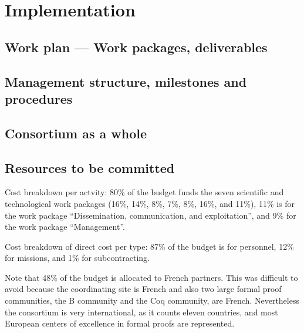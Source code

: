 \chapter{Implementation}\label{chap:implementation}

\section{Work plan --- Work packages, deliverables}



\section{Management structure, milestones and procedures}



\section{Consortium as a whole}\label{sec:consortium}



\section{Resources to be committed}\label{sec:resources}

\wpfigstyle{\scriptsize\setlength{\tabcolsep}{2pt}}
\wpfig%

Cost breakdown per actvity:
80\% of the budget funds the seven scientific and technological work
packages (16\%, 14\%, 8\%, 7\%, 8\%, 16\%, and 11\%), 11\% is for the
work package ``Dissemination, communication, and exploitation'', and
9\% for the work package ``Management''.

Cost breakdown of direct cost per type: 87\% of the budget is for personnel,
12\% for missions, and 1\% for subcontracting.

Note that 48\% of the budget is allocated to French partners.  This
was difficult to avoid because the coordinating site is French and
also two large formal proof communities, the B community and the Coq
community, are French.  Nevertheless the consortium is very
international, as it counts eleven countries, and most European
centers of excellence in formal proofs are represented.

